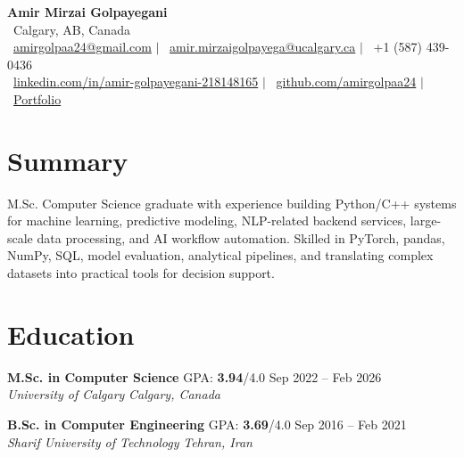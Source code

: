 \documentclass[a4paper,10pt]{article}
\newcommand{\resumeEducationSubheading}[5]{
    \textbf{#1} \hfill #2 \hfill #3 \\
    \textit{#4} \hfill \textit{#5}
}
\begin{document}

\begin{center}
    {\LARGE \textbf{Amir Mirzai Golpayegani}} \\[0.25em]
    \faMapMarker*~Calgary, AB, Canada \\[0.25em]
    \faEnvelope~\href{mailto:amirgolpaa24@gmail.com}{amirgolpaa24@gmail.com}
    $|$
    \faEnvelope~\href{mailto:amir.mirzaigolpayega@ucalgary.ca}{amir.mirzaigolpayega@ucalgary.ca}
    $|$
    \faPhone*~+1 (587) 439-0436 \\[0.25em]
    \faLinkedin~\href{https://linkedin.com/in/amir-golpayegani-218148165}{linkedin.com/in/amir-golpayegani-218148165}
    $|$
    \faGithub~\href{https://github.com/amirgolpaa24}{github.com/amirgolpaa24}
    $|$
    \faGlobe~\href{https://amir-portfolio-navy.vercel.app/}{Portfolio}
\end{center}


\section*{Summary}

M.Sc. Computer Science graduate with experience building Python/C++ systems for machine learning, predictive modeling, NLP-related backend services, large-scale data processing, and AI workflow automation. Skilled in PyTorch, pandas, NumPy, SQL, model evaluation, analytical pipelines, and translating complex datasets into practical tools for decision support.


\section*{Education}

\resumeEducationSubheading
{M.Sc. in Computer Science}
{GPA: \textbf{3.94}/4.0}
{Sep 2022 -- Feb 2026}
{University of Calgary}
{Calgary, Canada}

\vspace{0.35em}

\resumeEducationSubheading
{B.Sc. in Computer Engineering}
{GPA: \textbf{3.69}/4.0}
{Sep 2016 -- Feb 2021}
{Sharif University of Technology}
{Tehran, Iran}

\end{document}
